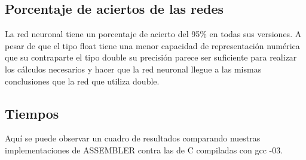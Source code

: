 \subsection{Porcentaje de aciertos de las redes}

La red neuronal tiene un porcentaje de acierto del 95\% en todas sus versiones. A pesar de que el tipo float tiene una menor capacidad de representación numérica que su contraparte el tipo double su precisión parece ser suficiente para realizar los cálculos necesarios y hacer que la red neuronal llegue a las mismas conclusiones que la red que utiliza double.

\subsection{Tiempos}

Aquí se puede observar un cuadro de resultados comparando nuestras implementaciones de ASSEMBLER contra las de C compiladas con gcc -03.

\begin{center}
\end{center}
